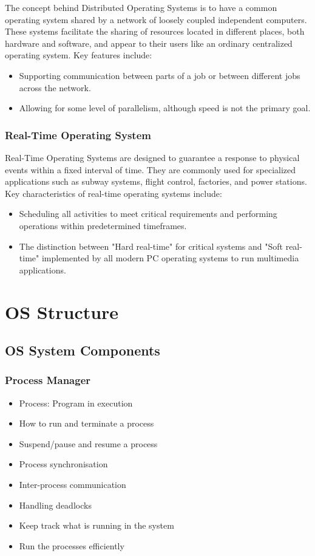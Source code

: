 \documentclass[11pt]{article}
\theoremstyle{definition}
\begin{document}
    The concept behind Distributed Operating Systems is to have a common operating system shared by a network of loosely coupled independent computers. These systems facilitate the sharing of resources located in different places, both hardware and software, and appear to their users like an ordinary centralized operating system. Key features include:

    \begin{itemize}
        \item Supporting communication between parts of a job or between different jobs across the network.
        \item Allowing for some level of parallelism, although speed is not the primary goal.
    \end{itemize}

\subsubsection{Real-Time Operating System}
    
    Real-Time Operating Systems are designed to guarantee a response to physical events within a fixed interval of time. They are commonly used for specialized applications such as subway systems, flight control, factories, and power stations. Key characteristics of real-time operating systems include:

    \begin{itemize}
        \item Scheduling all activities to meet critical requirements and performing operations within predetermined timeframes.
        \item The distinction between "Hard real-time" for critical systems and "Soft real-time" implemented by all modern PC operating systems to run multimedia applications.
    \end{itemize}
\section{OS Structure}
    \subsection{OS System Components}
        \subsubsection{Process Manager}
            \begin{itemize}
                \item Process: Program in execution
                \item How to run and terminate a process
                \item Suspend/pause and resume a process
                \item Process synchronisation
                \item Inter-process communication
                \item Handling deadlocks
                \item Keep track what is running in the system
                \item Run the processes efficiently
            \end{itemize}
\end{document}
